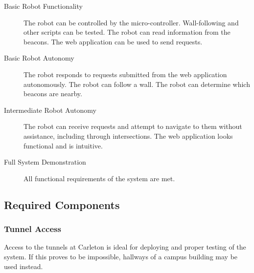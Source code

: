 \documentclass[12pt]{report}
\begin{document}
\begin{description}
   \item[Basic Robot Functionality] The robot can be controlled by the micro-controller. Wall-following and other scripts can be tested. The robot can read information from the beacons. The web application can be used to send requests.
   
  \item[Basic Robot Autonomy] The robot responds to requests submitted from the web application autonomously. The robot can follow a wall. The robot can determine which beacons are nearby.
  
  \item[Intermediate Robot Autonomy] The robot can receive requests and attempt to navigate to them without assistance, including through intersections. The web application looks functional and is intuitive.
   
   \item[Full System Demonstration] All functional requirements of the system are met.
   
\end{description}
\subsection{Required Components}
\subsubsection{Tunnel Access}
Access to the tunnels at Carleton is ideal for deploying and proper testing of the system. If this proves to be impossible, hallways of a campus building may be used instead.
\end{document}

